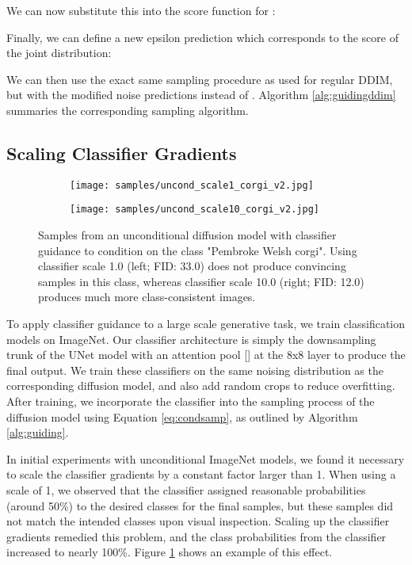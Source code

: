 \documentclass{article}
\newcommand{\shortcite}[1]{[\citenum{#1}]}
\begin{document}
We can now substitute this into the score function for :


Finally, we can define a new epsilon prediction  which corresponds to the score of the joint distribution:


We can then use the exact same sampling procedure as used for regular DDIM, but with the modified noise predictions  instead of . Algorithm \ref{alg:guidingddim} summaries the corresponding sampling algorithm. 

\subsection{Scaling Classifier Gradients}
\label{sec:scalingcg}
\begin{figure}[t!]
    \begin{center}
    \begin{subfigure}{0.475\textwidth}
        \centering
        \texttt{[image: samples/uncond\_scale1\_corgi\_v2.jpg]}
    \end{subfigure}
    \hspace{0.025\textwidth}
    \begin{subfigure}{0.475\textwidth}
        \centering
        \texttt{[image: samples/uncond\_scale10\_corgi\_v2.jpg]}
    \end{subfigure}
    \caption{\label{fig:uncond_scales} Samples from an unconditional diffusion model with classifier guidance to condition on the class "Pembroke Welsh corgi". Using classifier scale 1.0 (left; FID: 33.0) does not produce convincing samples in this class, whereas classifier scale 10.0 (right; FID: 12.0) produces much more class-consistent images.}
    \end{center}
\end{figure}

To apply classifier guidance to a large scale generative task, we train classification models on ImageNet. Our classifier architecture is simply the downsampling trunk of the UNet model with an attention pool \shortcite{clip} at the 8x8 layer to produce the final output. We train these classifiers on the same noising distribution as the corresponding diffusion model, and also add random crops to reduce overfitting. After training, we incorporate the classifier into the sampling process of the diffusion model using Equation \ref{eq:condsamp}, as outlined by Algorithm \ref{alg:guiding}.

In initial experiments with unconditional ImageNet models, we found it necessary to scale the classifier gradients by a constant factor larger than 1. When using a scale of 1, we observed that the classifier assigned reasonable probabilities (around 50\%) to the desired classes for the final samples, but these samples did not match the intended classes upon visual inspection.
Scaling up the classifier gradients remedied this problem, and the class probabilities from the classifier increased to nearly 100\%. Figure \ref{fig:uncond_scales} shows an example of this effect.
\end{document}
